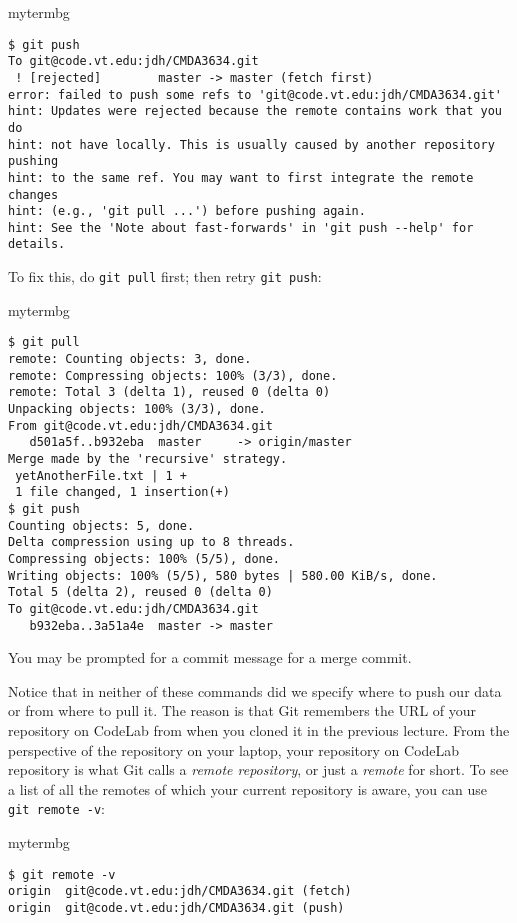 \begin{tsession}{mytermbg}
\begin{verbatim}
$ git push
To git@code.vt.edu:jdh/CMDA3634.git
 ! [rejected]        master -> master (fetch first)
error: failed to push some refs to 'git@code.vt.edu:jdh/CMDA3634.git'
hint: Updates were rejected because the remote contains work that you do
hint: not have locally. This is usually caused by another repository pushing
hint: to the same ref. You may want to first integrate the remote changes
hint: (e.g., 'git pull ...') before pushing again.
hint: See the 'Note about fast-forwards' in 'git push --help' for details.
\end{verbatim}
\end{tsession}

To fix this, do \texttt{git pull} first; then retry \texttt{git push}:

\begin{tsession}{mytermbg}
\begin{verbatim}
$ git pull
remote: Counting objects: 3, done.
remote: Compressing objects: 100% (3/3), done.
remote: Total 3 (delta 1), reused 0 (delta 0)
Unpacking objects: 100% (3/3), done.
From git@code.vt.edu:jdh/CMDA3634.git
   d501a5f..b932eba  master     -> origin/master
Merge made by the 'recursive' strategy.
 yetAnotherFile.txt | 1 +
 1 file changed, 1 insertion(+)
$ git push
Counting objects: 5, done.
Delta compression using up to 8 threads.
Compressing objects: 100% (5/5), done.
Writing objects: 100% (5/5), 580 bytes | 580.00 KiB/s, done.
Total 5 (delta 2), reused 0 (delta 0)
To git@code.vt.edu:jdh/CMDA3634.git
   b932eba..3a51a4e  master -> master
\end{verbatim}
\end{tsession}

You may be prompted for a commit message for a merge commit.

Notice that in neither of these commands did we specify where to push our data
or from where to pull it.  The reason is that Git remembers the URL of your
repository on CodeLab from when you cloned it in the previous lecture.  From
the perspective of the repository on your laptop, your repository on CodeLab
repository is what Git calls a \emph{remote repository}, or just a
\emph{remote} for short.  To see a list of all the remotes of which your
current repository is aware, you can use \texttt{git remote -v}:

\begin{tsession}{mytermbg}
\begin{verbatim}
$ git remote -v
origin	git@code.vt.edu:jdh/CMDA3634.git (fetch)
origin	git@code.vt.edu:jdh/CMDA3634.git (push)
\end{verbatim}
\end{tsession}

